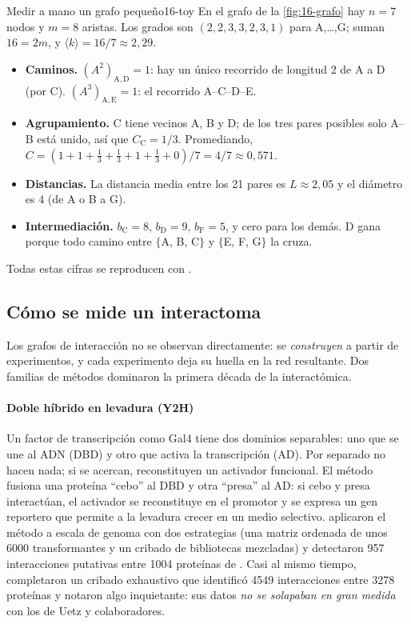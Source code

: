 \begin{ejemplo}{Medir a mano un grafo pequeño}{16-toy}
En el grafo de la \cref{fig:16-grafo} hay $n=7$ nodos y $m=8$ aristas. Los grados son $(2,2,3,3,2,3,1)$ para A,\dots,G; suman $16=2m$, y $\langle k\rangle=16/7\approx2{,}29$.
\begin{itemize}
  \item \textbf{Caminos.} $(A^2)_{\mathrm{A,D}}=1$: hay un único recorrido de longitud 2 de A a D (por C). $(A^3)_{\mathrm{A,E}}=1$: el recorrido A--C--D--E.
  \item \textbf{Agrupamiento.} C tiene vecinos A, B y D; de los tres pares posibles solo A--B está unido, así que $C_{\mathrm{C}}=1/3$. Promediando, $C=(1+1+\tfrac13+\tfrac13+1+\tfrac13+0)/7=4/7\approx0{,}571$.
  \item \textbf{Distancias.} La distancia media entre los 21 pares es $L\approx2{,}05$ y el diámetro es 4 (de A o B a G).
  \item \textbf{Intermediación.} $b_{\mathrm{C}}=8$, $b_{\mathrm{D}}=9$, $b_{\mathrm{F}}=5$, y cero para los demás. D gana porque todo camino entre $\{$A, B, C$\}$ y $\{$E, F, G$\}$ la cruza.
\end{itemize}
Todas estas cifras se reproducen con .
\end{ejemplo}

\subsection{Cómo se mide un interactoma}

Los grafos de interacción no se observan directamente: se \emph{construyen} a partir de experimentos, y cada experimento deja su huella en la red resultante. Dos familias de métodos dominaron la primera década de la interactómica.

\paragraph{Doble híbrido en levadura (Y2H)} Un factor de transcripción como Gal4 tiene dos dominios separables: uno que se une al ADN (DBD) y otro que activa la transcripción (AD). Por separado no hacen nada; si se acercan, reconstituyen un activador funcional. El método fusiona una proteína ``cebo'' al DBD y otra ``presa'' al AD: si cebo y presa interactúan, el activador se reconstituye en el promotor y se expresa un gen reportero que permite a la levadura crecer en un medio selectivo. \textcite{c16-uetz2000} aplicaron el método a escala de genoma con dos estrategias (una matriz ordenada de unos 6000 transformantes y un cribado de bibliotecas mezcladas) y detectaron 957 interacciones putativas entre \num{1004} proteínas de . Casi al mismo tiempo, \textcite{c16-ito2001} completaron un cribado exhaustivo que identificó \num{4549} interacciones entre \num{3278} proteínas y notaron algo inquietante: sus datos \emph{no se solapaban en gran medida} con los de Uetz y colaboradores.


